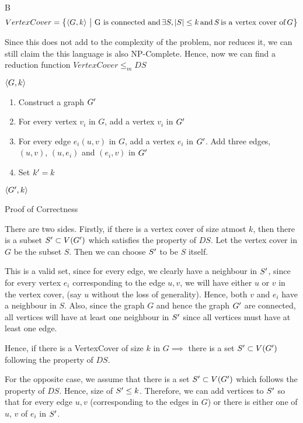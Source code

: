 \documentclass{article}
\begin{document}
\begin{question}
\begin{qpart}{B}
		\begin{align*}
			VertexCover = \left\{ \left\langle G, k \right\rangle \,\big|\, \,\text{G is connected and}\, \exists S, \left| {S} \right| \le k \,\text{and}\, S \,\text{is a vertex cover of}\, G \right\}
		\end{align*}

		Since this does not add to the complexity of the problem, nor reduces it, we can still claim the this language is also NP-Complete. Hence, now we can find a reduction function $VertexCover \le _m DS$ \br%


		 \br%

		 $\left\langle G, k \right\rangle$
		\begin{enumerate}[label = (\alph*) ]
			\item Construct a graph $G^{\prime}$
			\item For every vertex $v_i$ in $G$, add a vertex $v_i$ in $G^{\prime}$
			\item For every edge $e_i (u, v)$ in $G$, add a vertex $e_i$ in $G^{\prime}$. Add three edges, $(u, v)$, $(u, e_i)$ and $(e_i, v)$ in $G^{\prime}$
			\item Set $k^{\prime} = k$
		\end{enumerate}
		 $\left\langle G^{\prime}, k \right\rangle$

		\begin{qsubsection}{Proof of Correctness}

			There are two sides. Firstly, if there is a vertex cover of size atmost $k$, then there is a subset $S^{\prime} \subset V(G^{\prime})$ which satisfies the property of $DS$. Let the vertex cover in $G$ be the subset $S$. Then we can choose $S^{\prime}$ to be $S$ itself. \br%

			This is a valid set, since for every edge, we clearly have a neighbour in $S^{\prime}$, since for every vertex $e_i$ corresponding to the edge $u, v$, we will have either $u$ or $v$ in the vertex cover, (say $u$ without the loss of generality). Hence, both $v$ and $e_i$ have a neighbour in $S$. Also, since the graph $G$ and hence the graph $G^{\prime}$ are connected, all vertices will have at least one neighbour in $S^{\prime}$ since all vertices must have at least one edge. \br%

			Hence, if there is a VertexCover of size $k$ in $G \implies$ there is a set $S^{\prime} \subset V(G^{\prime})$ following the property of $DS$. \br%

			For the opposite case, we assume that there is a set $S^{\prime} \subset V(G^{\prime})$ which follows the property of $DS$. Hence, size of $S^{\prime} \le k$. Therefore, we can add vertices to $S^{\prime}$ so that for every edge $u, v$ (corresponding to the edges in $G$) or there is either one of $u$, $v$ of $e_i$ in $S^{\prime}$. \br%
			

\end{qsubsection}
\end{qpart}
\end{question}
\end{document}
